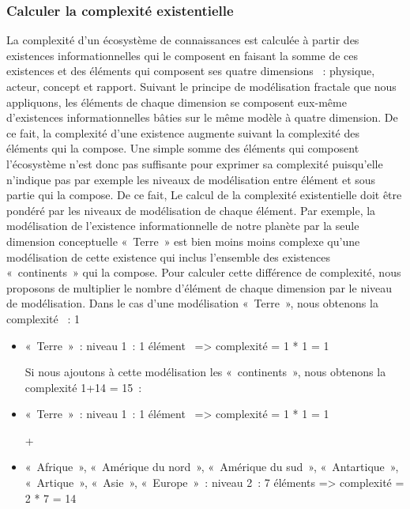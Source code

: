 \documentclass[
  a4paper,
  DIV=11,
  numbers=noendperiod]{scrreprt}
\begin{document}
\subsubsection{Calculer la complexité
existentielle}\label{calculer-la-complexituxe9-existentielle}

La complexité d'un écosystème de connaissances est calculée à partir des
existences informationnelles qui le composent en faisant la somme de ces
existences et des éléments qui composent ses quatre dimensions ~:
physique, acteur, concept et rapport. Suivant le principe de
modélisation fractale que nous appliquons, les éléments de chaque
dimension se composent eux-même d'existences informationnelles bâties
sur le même modèle à quatre dimension. De ce fait, la complexité d'une
existence augmente suivant la complexité des éléments qui la compose.
Une simple somme des éléments qui composent l'écosystème n'est donc pas
suffisante pour exprimer sa complexité puisqu'elle n'indique pas par
exemple les niveaux de modélisation entre élément et sous partie qui la
compose. De ce fait, Le calcul de la complexité existentielle doit être
pondéré par les niveaux de modélisation de chaque élément. Par exemple,
la modélisation de l'existence informationnelle de notre planète par la
seule dimension conceptuelle «~Terre~» est bien moins moins complexe
qu'une modélisation de cette existence qui inclus l'ensemble des
existences «~continents~» qui la compose. Pour calculer cette différence
de complexité, nous proposons de multiplier le nombre d'élément de
chaque dimension par le niveau de modélisation. Dans le cas d'une
modélisation «~Terre~», nous obtenons la complexité ~: 1

\begin{itemize}
\item
  «~Terre~»~: niveau 1~: 1 élément~ =\textgreater{} complexité = 1 * 1 =
  1

  Si nous ajoutons à cette modélisation les «~continents~», nous
  obtenons la complexité 1+14 = 15~:
\item
  «~Terre~»~: niveau 1~: 1 élément~ =\textgreater{} complexité = 1 * 1 =
  1

  +
\item
  «~Afrique~», «~Amérique du nord~», «~Amérique du sud~»,
  «~Antartique~», «~Artique~», «~Asie~», «~Europe~»~: niveau 2~: 7
  éléments =\textgreater{} complexité = 2 * 7 = 14
\end{itemize}
\end{document}
